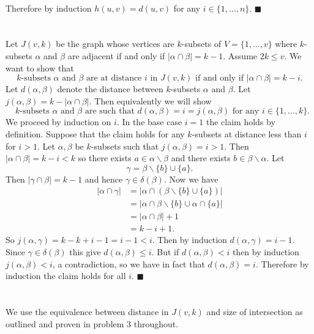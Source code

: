 \documentclass[letterpaper,12pt,oneside,onecolumn]{article}
\newcommand{\1}{\mathbbm{1}}
\begin{document}
\paragraph{}
Therefore by induction $h(u,v) = d(u,v)$ for any $i \in \{1,\dots, n\}$. $\blacksquare$

\section{}
Let $J(v,k)$ be the graph whose vertices are $k$-subsets of $V = \{1,\dots,v\}$ where $k$-subsets $\alpha$ and $\beta$ are adjacent if and only if $|\alpha \cap \beta | = k-1$. Assume $2k \leq v$. We want to show that $$\text{$k$-subsets $\alpha$ and $\beta$ are at distance $i$ in $J(v,k)$ if and only if $|\alpha \cap \beta | = k-i$}.$$
Let $d(\alpha,\beta)$ denote the distance between $k$-subsets $\alpha$ and $\beta$. Let $j(\alpha, \beta) = k - |\alpha \cap \beta|$. Then equivalently we will show
$$\text{ $k$-subsets $\alpha$ and $\beta$ are such that $d(\alpha, \beta) = i = j(\alpha, \beta)$ for any $i \in \{1, \dots, k\}$}.$$
We proceed by induction on $i$. In the base case $i=1$ the claim holds by definition. Suppose that the claim holds for any $k$-subsets at distance less than $i$ for $i>1$. Let $\alpha, \beta$ be $k$-subsets such that $j(\alpha, \beta) = i > 1$.  Then 
$|\alpha \cap \beta| = k -i < k$
so there exists $a \in \alpha\backslash\beta$ and there exists $b \in \beta\backslash\alpha$.  Let $$\gamma = \beta \backslash \{b\} \cup \{a\}.$$
Then $|\gamma \cap \beta | = k-1$ and hence $\gamma \in \delta(\beta)$. Now we have
\begin{align*}
|\alpha \cap \gamma | &= | \alpha \cap (\beta \backslash \{b\} \cup \{a\})| \\
&= | \alpha \cap \beta \backslash\{b\} \cup \alpha \cap \{a\}| \\
&=|\alpha \cap \beta | + 1 \\
&= k - i + 1.
\end{align*}
So $j(\alpha, \gamma) = k - k + i -1 = i -1 < i$. Then by induction $d(\alpha, \gamma) = i-1$. Since $\gamma \in \delta(\beta)$ this give $d(\alpha, \beta) \leq i$. But if $d(\alpha,\beta) < i$ then by induction $j(\alpha, \beta) < i$, a contradiction, so we have in fact that $d(\alpha, \beta) = i$. Therefore by induction the claim holds for all $i$. $\blacksquare$
\section{}
\paragraph{}
We use the equivalence between distance in $J(v,k)$ and size of intersection as outlined and proven in problem $3$ throughout.
\end{document}
